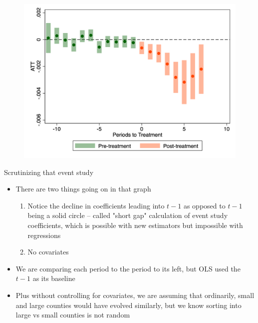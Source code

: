 \documentclass{beamer}
\begin{document}
\begin{frame}

\begin{figure}
    \centering
    \includegraphics[height=0.85\textheight]{./lecture_includes/es_br1544_shortgap.png}
\end{figure}

\end{frame}


\begin{frame}{Scrutinizing that event study}

\begin{itemize}
\item There are two things going on in that graph
	\begin{enumerate}
	\item Notice the decline in coefficients leading into $t-1$ as opposed to $t-1$ being a solid circle -- called "short gap" calculation of event study coefficients, which is possible with new estimators but impossible with regressions
	\item No covariates
	\end{enumerate}
\item We are comparing each period to the period to its left, but OLS used the $t-1$ as its baseline
\item Plus without controlling for covariates, we are assuming that ordinarily, small and large counties would have evolved similarly, but we know sorting into large vs small counties is not random
\end{itemize}
\end{frame}
\end{document}

